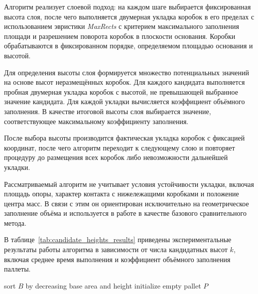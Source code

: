 Алгоритм реализует слоевой подход: на каждом шаге выбирается фиксированная высота слоя, после чего выполняется двумерная укладка коробок в его пределах с использованием эвристики \textit{MaxRects} с критерием максимального заполнения площади и разрешением поворота коробок в плоскости основания. Коробки обрабатываются в фиксированном порядке, определяемом площадью основания и высотой.

Для определения высоты слоя формируется множество потенциальных значений на основе высот неразмещённых коробок. Для каждого кандидата выполняется пробная двумерная укладка коробок с высотой, не превышающей выбранное значение кандидата. Для каждой укладки вычисляется коэффициент объёмного заполнения. В качестве итоговой высоты слоя выбирается значение, соответствующее максимальному коэффициенту заполнения.

После выбора высоты производится фактическая укладка коробок с фиксацией координат, после чего алгоритм переходит к следующему слою и повторяет процедуру до размещения всех коробок либо невозможности дальнейшей укладки.

Рассматриваемый алгоритм не учитывает условия устойчивости укладки, включая площадь опоры, характер контакта с нижележащими коробками и положение центра масс. В связи с этим он ориентирован исключительно на геометрическое заполнение объёма и используется в работе в качестве базового сравнительного метода.

В таблице~\ref{tab:candidate_heights_results} приведены экспериментальные результаты работы алгоритма в зависимости от числа кандидатных высот $k$, включая среднее время выполнения и коэффициент объёмного заполнения паллеты.

\begin{algorithm}[H]
\caption{Layer-based palletization with Candidate Heights}
\label{alg:candidate_heights}

sort $B$ by decreasing base area and height\;
initialize empty pallet $P$\;


\;
\end{algorithm}


